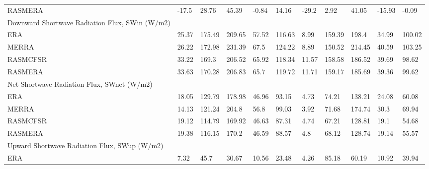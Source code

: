 \begin{table}[]
{\begin{tabular}{lllllllllll}
RASMERA                                        & -17.5                        & 28.76  & 45.39  & -0.84  & 14.16  & -29.2  & 2.92   & 41.05  & -15.93 & -0.09  \\
Downward Shortwave Radiation Flux, SWin (W/m2) &                              &        &        &        &        &        &        &        &        &        \\
ERA                                            & 25.37                        & 175.49 & 209.65 & 57.52  & 116.63 & 8.99   & 159.39 & 198.4  & 34.99  & 100.02 \\
MERRA                                          & 26.22                        & 172.98 & 231.39 & 67.5   & 124.22 & 8.89   & 150.52 & 214.45 & 40.59  & 103.25 \\
RASMCFSR                                       & 33.22                        & 169.3  & 206.52 & 65.92  & 118.34 & 11.57  & 158.58 & 186.52 & 39.69  & 98.62  \\
RASMERA                                        & 33.63                        & 170.28 & 206.83 & 65.7   & 119.72 & 11.71  & 159.17 & 185.69 & 39.36  & 99.62  \\
Net Shortwave Radiation Flux, SWnet (W/m2)     &                              &        &        &        &        &        &        &        &        &        \\
ERA                                            & 18.05                        & 129.79 & 178.98 & 46.96  & 93.15  & 4.73   & 74.21  & 138.21 & 24.08  & 60.08  \\
MERRA                                          & 14.13                        & 121.24 & 204.8  & 56.8   & 99.03  & 3.92   & 71.68  & 174.74 & 30.3   & 69.94  \\
RASMCFSR                                       & 19.12                        & 114.79 & 169.92 & 46.63  & 87.31  & 4.74   & 67.21  & 128.81 & 19.1   & 54.68  \\
RASMERA                                        & 19.38                        & 116.15 & 170.2  & 46.59  & 88.57  & 4.8    & 68.12  & 128.74 & 19.14  & 55.57  \\
Upward Shortwave Radiation Flux, SWup (W/m2)   &                              &        &        &        &        &        &        &        &        &        \\
ERA                                            & 7.32                         & 45.7   & 30.67  & 10.56  & 23.48  & 4.26   & 85.18  & 60.19  & 10.92  & 39.94  \\

\end{tabular}}
\end{table}
